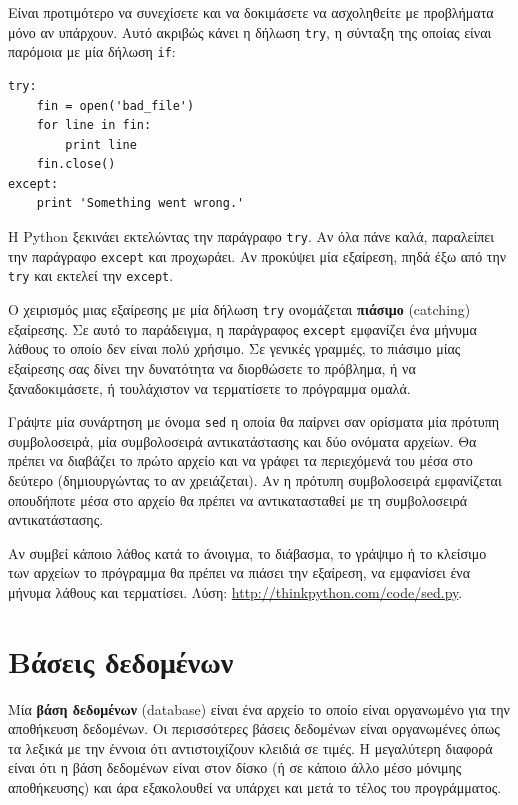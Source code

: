 \documentclass[10pt]{book}
\begin{document}
Είναι προτιμότερο να συνεχίσετε και να δοκιμάσετε να ασχοληθείτε με προβλήματα μόνο αν υπάρχουν. Αυτό ακριβώς κάνει η δήλωση {\tt try}, η σύνταξη της οποίας είναι παρόμοια με μία δήλωση {\tt if}: 

\begin{verbatim}
try:
    fin = open('bad_file')
    for line in fin:
        print line
    fin.close()
except:
    print 'Something went wrong.'
\end{verbatim}
%
Η Python ξεκινάει εκτελώντας την παράγραφο {\tt try}. Αν όλα πάνε καλά, παραλείπει την παράγραφο {\tt except} και προχωράει. Αν προκύψει μία εξαίρεση, πηδά έξω από την {\tt try} και εκτελεί την {\tt except}.

Ο χειρισμός μιας εξαίρεσης με μία δήλωση {\tt try} ονομάζεται {\bf πιάσιμο} (catching) εξαίρεσης. Σε αυτό το παράδειγμα, η παράγραφος {\tt except} εμφανίζει ένα μήνυμα λάθους το οποίο δεν είναι πολύ χρήσιμο. Σε γενικές 
γραμμές, το πιάσιμο μίας εξαίρεσης σας δίνει την δυνατότητα να διορθώσετε το πρόβλημα, ή να ξαναδοκιμάσετε, ή τουλάχιστον να τερματίσετε το πρόγραμμα ομαλά.
\\
\begin{exercise}

Γράψτε μία συνάρτηση με όνομα {\tt sed} η οποία θα παίρνει σαν ορίσματα μία πρότυπη συμβολοσειρά, μία συμβολοσειρά αντικατάστασης και δύο ονόματα αρχείων. Θα πρέπει να διαβάζει το πρώτο αρχείο και να γράφει τα περιεχόμενά του μέσα στο δεύτερο (δημιουργώντας το αν χρειάζεται). Αν η πρότυπη συμβολοσειρά εμφανίζεται οπουδήποτε μέσα στο αρχείο θα πρέπει να αντικατασταθεί με τη συμβολοσειρά αντικατάστασης.

Αν συμβεί κάποιο λάθος κατά το άνοιγμα, το διάβασμα, το γράψιμο ή το κλείσιμο των αρχείων το πρόγραμμα θα πρέπει να πιάσει την εξαίρεση, να εμφανίσει ένα μήνυμα λάθους και τερματίσει. Λύση: \url{http://thinkpython.com/code/sed.py}.
\end{exercise}

 
\section{Βάσεις δεδομένων}

Μία {\bf βάση δεδομένων} (database) είναι ένα αρχείο το οποίο είναι οργανωμένο για την αποθήκευση δεδομένων. 
Οι περισσότερες βάσεις δεδομένων είναι οργανωμένες όπως τα λεξικά με την έννοια ότι αντιστοιχίζουν κλειδιά σε τιμές. Η μεγαλύτερη διαφορά είναι ότι η βάση δεδομένων είναι στον δίσκο (ή σε κάποιο άλλο μέσο μόνιμης αποθήκευσης) και άρα εξακολουθεί να υπάρχει και μετά το τέλος του προγράμματος.
\end{document}

